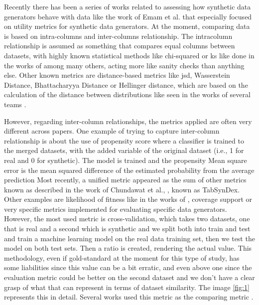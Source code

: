 Recently there has been a series of works related to assessing how synthetic data generators behave with data like the work of Emam et al. \cite{emamUtilityMetricsEvaluating2022} that especially focused on utility metrics for synthetic data generators. At the moment, comparing data is based on intra-columns and inter-columns relationship. The intracolumn relationship is assumed as something that compares equal columns between datasets, with highly known statistical methods like chi-squared or \ac{ks} like done in the works of \cite{combrinkComparingSyntheticTabular2022} among many others, acting more like sanity checks than anything else. 
Other known metrics are distance-based metrics like \ac{jsd}, Wasserstein Distance, Bhattacharyya Distance or Hellinger distance, which are based on the calculation of the distance between distributions like seen in the works of several teams \cite{ISI:000557358500024,choiGeneratingMultilabelDiscrete2017,Baowaly2019}.

However, regarding inter-column relationships, the metrics applied are often very different across papers. One example of trying to capture inter-column relationship is about the use of propensity score \cite{rosenbaumCentralRolePropensity1983,mullerEvaluationSyntheticElectronic2022} where a classifier is trained to the merged datasets, with the added variable of the original dataset (i.e., 1 for real and 0 for synthetic). The model is trained and the propensity Mean square error is the  mean squared difference of the estimated probability from the average prediction
Most recently, a unified metric appeared as the sum of other metrics known as described in the work of Chundawat et al., \cite{chundawatTabSynDexUniversalMetric2022}, known as TabSynDex. Other examples are likelihood of fitness like in the works of \cite{xuModelingTabularData2019b}, coverage support \cite{goncalvesGenerationEvaluationSynthetic2020a} or very specific metrics implemented for evaluating specific data generators.
However, the most used metric is cross-validation, which takes two datasets, one that is real and a second which is synthetic and we split both into train and test and train a machine learning model on the real data training set, then we test the model on both test sets. Then a ratio is created, rendering the actual value. This methodology, even if gold-standard at the moment for this type of study, has some liabilities since this value can be a bit erratic, and even above one since the evaluation metric could be better on the second dataset and we don't have a clear grasp of what that can represent in terms of dataset similarity. The image \ref{fig:1} represents this in detail. Several works used this metric as the comparing metric \cite{mullerEvaluationSyntheticElectronic2022}.


